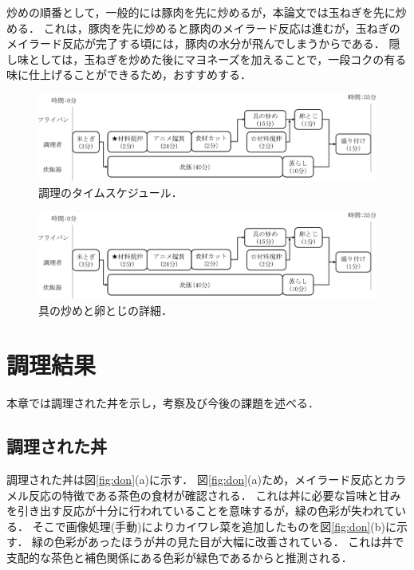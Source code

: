 炒めの順番として，一般的には豚肉を先に炒めるが，本論文では玉ねぎを先に炒める．
これは，豚肉を先に炒めると豚肉のメイラード反応は進むが，玉ねぎのメイラード反応が完了する頃には，豚肉の水分が飛んでしまうからである．
隠し味としては，玉ねぎを炒めた後にマヨネーズを加えることで，一段コクの有る味に仕上げることができるため，おすすめする．


\begin{figure}[ht]
\centering
\includegraphics[page=1, width=16.00000cm]{./fig/fig_bb.pdf}
\caption{調理のタイムスケジュール．\label{fig:time}}
\end{figure}


\begin{figure}[ht]
\centering
\includegraphics[page=2, width=12.00000cm]{./fig/fig_bb.pdf}
\caption{具の炒めと卵とじの詳細．\label{fig:flypan}}
\end{figure}

\clearpage

\section{調理結果}\label{ux8abfux7406ux7d50ux679c}

本章では調理された丼を示し，考察及び今後の課題を述べる．

\subsection{調理された丼}\label{ux8abfux7406ux3055ux308cux305fux4e3c}

調理された丼は図\ref{fig:don}(a)に示す．
図\ref{fig:don}(a)ため，メイラード反応とカラメル反応の特徴である茶色の食材が確認される．
これは丼に必要な旨味と甘みを引き出す反応が十分に行われていることを意味するが，緑の色彩が失われている．
そこで画像処理(手動)によりカイワレ菜を追加したものを図\ref{fig:don}(b)に示す．
緑の色彩があったほうが丼の見た目が大幅に改善されている．
これは丼で支配的な茶色と補色関係にある色彩が緑色であるからと推測される．


